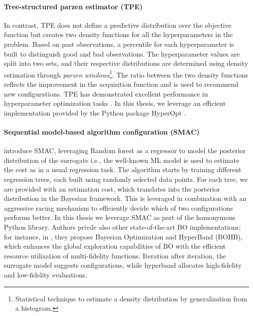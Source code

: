 \paragraph{Tree-structured parzen estimator (TPE)} In contrast, TPE does not define a predictive distribution over the objective function but creates two density functions for all the hyperparameters in the problem.
Based on past observations, a percentile for each hyperparameter is built to distinguish good and bad observations.
The hyperparameter values are split into two sets, and their respective distributions are determined using density estimation through \textit{parzen windows}\footnote{Statistical technique to estimate a density distribution by generalization from a histogram.}.
The ratio between the two density functions reflects the improvement in the acquisition function and is used to recommend new configurations.
TPE has demonstrated excellent performance in hyperparameter optimization tasks \cite{bergstra2011algorithms, bergstra2013making, eggensperger2013towards, falkner2018bohb, sparks2015automating}.
In this thesis, we leverage an efficient implementation provided by the Python package HyperOpt \cite{bergstra2015hyperopt}.

\paragraph{Sequential model-based algorithm configuration (SMAC)} \cite{lindauer-jmlr22a} introduce SMAC, leveraging Random forest \cite{random_forest} as a regressor to model the posterior distribution of the surrogate i.e., the well-known ML model is used to estimate the cost as in a usual regression task.
The algorithm starts by training different regression trees, each built using randomly selected data points.
For each tree, we are provided with an estimation cost, which translates into the posterior distribution in the Bayesian framework.
This is leveraged in combination with an aggressive racing mechanism to efficiently decide which of two configurations performs better.
In this thesis we leverage SMAC as part of the homonymous Python library.
Authors privde also other state-of-the-art BO implementations; for instance, in \cite{falkner2018bohb}, they propose Bayesian Optimization and HyperBand (BOHB), which enhances the global exploration capabilities of BO with the efficient resource utilization of multi-fidelity functions.
Iteration after iteration, the surrogate model suggests configurations, while hyperband allocates high-fidelity and low-fidelity evaluations.


